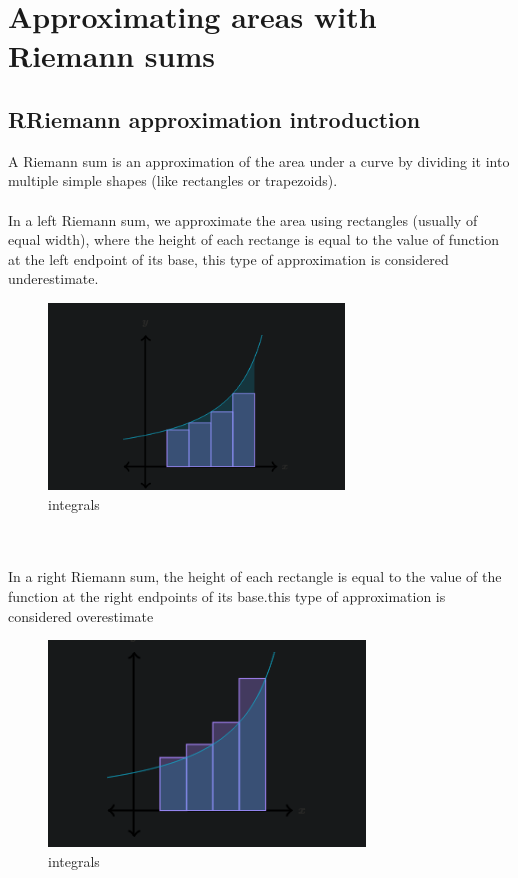 \documentclass{article}
\begin{document}
    \section{Approximating areas with Riemann sums}
        \subsection{RRiemann approximation introduction}
            A Riemann sum is an approximation of the area under a curve by dividing it into multiple simple shapes (like rectangles or trapezoids).\\\\
            In a left Riemann sum, we approximate the area using rectangles (usually of equal width), where the height of each rectange is equal to the value of function at the left endpoint of its base, this type of approximation is considered underestimate.\\
            \begin{figure}[ht]
                \centering
                \includegraphics[bb=0 0 387 244, width=0.7\textwidth]{images/left_riem.png}
                \caption{integrals}\label{fig:left Reimann}
            \end{figure} \\ \\
            In a right Riemann sum, the height of each rectangle is equal to the value of the function at the right endpoints of its base.this type of approximation is considered overestimate\\
            \begin{figure}[ht]
                \centering
                \includegraphics[bb=0 0 355 244, width=0.75\textwidth]{images/right_riem.png}
                \caption{integrals}\label{fig:right Reimann}
            \end{figure} \\
\end{document}
